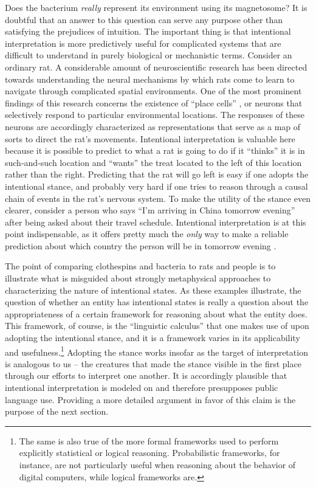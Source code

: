 Does the bacterium \textit{really} represent its environment using its magnetosome? It is doubtful that an answer to this question can serve any purpose other than satisfying the prejudices of intuition. The important thing is that intentional interpretation is more predictively useful for complicated systems that are difficult to understand in purely biological or mechanistic terms. Consider an ordinary rat. A considerable amount of neuroscientific research has been directed towards understanding the neural mechanisms by which rats come to learn to navigate through complicated spatial environments. One of the most prominent findings of this research concerns the existence of ``place cells'' \citep{McNaughton:1993}, or neurons that selectively respond to particular environmental locations. The responses of these neurons are accordingly characterized as representations that serve as a map of sorts to direct the rat's movements. Intentional interpretation is valuable here because it is possible to predict to what a rat is going to do if it ``thinks'' it is in such-and-such location and ``wants'' the treat located to the left of this location rather than the right. Predicting that the rat will go left is easy if one adopts the intentional stance, and probably very hard if one tries to reason through a causal chain of events in the rat's nervous system. To make the utility of the stance even clearer, consider a person who says ``I'm arriving in China tomorrow evening'' after being asked about their travel schedule. Intentional interpretation is at this point indispensable, as it offers pretty much the \textit{only} way to make a reliable prediction about which country the person will be in tomorrow evening \citep{Dennett:1987}. 

The point of comparing clothespins and bacteria to rats and people is to illustrate what is misguided about strongly metaphysical approaches to characterizing the nature of intentional states. As these examples illustrate, the question of whether an entity has intentional states is really a question about the appropriateness of a certain framework for reasoning about what the entity does. This framework, of course, is the ``linguistic calculus'' that one makes use of upon adopting the intentional stance, and it is a framework varies in its applicability and usefulness.\footnote{The same is also true of the more formal frameworks used to perform explicitly statistical or logical reasoning. Probabilistic frameworks, for instance, are not particularly useful when reasoning about the behavior of digital computers, while logical frameworks are.} Adopting the stance works insofar as the target of interpretation is analogous to us -- the creatures that made the stance visible in the first place through our efforts to interpret one another. It is accordingly plausible that intentional interpretation is modeled on and therefore presupposes public language use. Providing a more detailed argument in favor of this claim is the purpose of the next section. 

